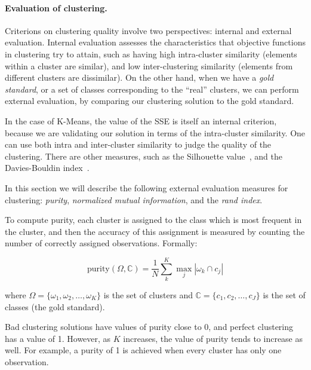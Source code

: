 \paragraph{Evaluation of clustering.} 
%
Criterions on clustering quality involve two perspectives: internal and external
evaluation.
%
Internal evaluation assesses the characteristics that objective functions in
clustering try to attain, such as having high intra-cluster similarity (elements
within a cluster are similar), and low inter-clustering similarity (elements
from different clusters are dissimilar).
%
On the other hand, when we have a {\em gold standard}, or a set of classes
corresponding to the ``real'' clusters, we can perform external evaluation, by
comparing our clustering solution to the gold standard.


In the case of K-Means, the value of the SSE is itself an internal criterion,
because we are validating our solution in terms of the intra-cluster similarity.
%
One can use both intra and inter-cluster similarity to judge the quality of the
clustering. There are other measures, such as the Silhouette
value~\cite{rousseeuw1987silhouettes}, and the Davies-Bouldin
index~\cite{davies1979cluster}.


In this section we will describe the following external evaluation measures for
clustering: {\em purity}, {\em normalized mutual information}, and the {\em rand
index}.


To compute purity, each cluster is assigned to the class which is most frequent
in the cluster, and then the accuracy of this assignment is measured by counting
the number of correctly assigned observations.
%
Formally:

$$ \text{purity}(\Omega, \mathbb{C}) = \frac{1}{N} \sum_{k}^K \max_j |\omega_k \cap c_j|$$

where $\Omega = \{\omega_1, \omega_2, \ldots, \omega_K\}$ is the set of clusters
and $\mathbb{C} = \{c_1, c_2, \ldots, c_J\}$ is the set of classes (the gold
standard).


Bad clustering solutions have values of purity close to 0, and perfect
clustering has a value of 1. 
%
However, as $K$ increases, the value of purity tends to increase as well. 
%
For example, a purity of 1 is achieved when every cluster has only one
observation.


